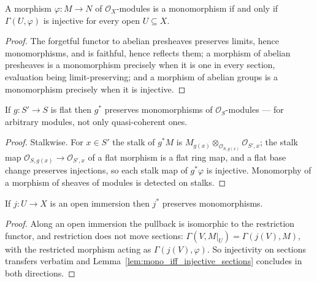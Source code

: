 \begin{lemma}\leanok
  \label{lem:mono_iff_injective_sections}
  A morphism \(\varphi : M \to N\) of \(\mathcal{O}_X\)-modules is a monomorphism if and only if
  \(\Gamma(U, \varphi)\) is injective for every open \(U \subseteq X\).
\end{lemma}

\begin{proof}\leanok
  The forgetful functor to abelian presheaves preserves limits, hence monomorphisms, and is
  faithful, hence reflects them; a morphism of abelian presheaves is a monomorphism precisely
  when it is one in every section, evaluation being limit-preserving; and a morphism of abelian
  groups is a monomorphism precisely when it is injective.
\end{proof}

\begin{lemma}
  \label{lem:pullback_preserves_monos}
  If \(g : S' \to S\) is flat then \(g^*\) preserves monomorphisms of
  \(\mathcal{O}_S\)-modules --- for arbitrary modules, not only quasi-coherent ones.
\end{lemma}

\begin{proof}
  Stalkwise. For \(x \in S'\) the stalk of \(g^* M\) is
  \(M_{g(x)} \otimes_{\mathcal{O}_{S, g(x)}} \mathcal{O}_{S', x}\); the stalk map
  \(\mathcal{O}_{S, g(x)} \to \mathcal{O}_{S', x}\) of a flat morphism is a flat ring map, and a
  flat base change preserves injections, so each stalk map of \(g^* \varphi\) is injective.
  Monomorphy of a morphism of sheaves of modules is detected on stalks.
\end{proof}

\begin{lemma}\leanok
  \label{lem:pullback_preserves_monos_openImmersion}
  If \(j : U \to X\) is an open immersion then \(j^*\) preserves monomorphisms.
\end{lemma}

\begin{proof}\leanok
  Along an open immersion the pullback is isomorphic to the restriction functor, and restriction
  does not move sections: \(\Gamma(V, M|_U) = \Gamma(j(V), M)\), with the restricted morphism
  acting as \(\Gamma(j(V), \varphi)\). So injectivity on sections transfers verbatim and
  Lemma~\ref{lem:mono_iff_injective_sections} concludes in both directions.
\end{proof}

